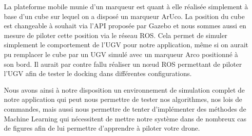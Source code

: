 La plateforme mobile munie d’un marqueur est quant à elle réalisée simplement à base d’un cube sur lequel on a disposé un marqueur ArUco. La position du cube est changeable à souhait via l’API proposée par Gazebo et nous sommes aussi en mesure de piloter cette position via le réseau ROS. Cela permet de simuler simplement le comportement de l’UGV pour notre application, même si on aurait pu remplacer le cube par un UGV simulé avec un marqueur Arco positionné à son bord. Il aurait par contre fallu réaliser un nœud ROS permettant de piloter l’UGV afin de tester le docking dans différentes configurations.

Nous avons ainsi à notre disposition un environnement de simulation complet de notre application qui peut nous permettre de tester nos algorithmes, nos lois de commandes, mais aussi nous permettre de tenter d’implémenter des méthodes de Machine Learning qui nécessitent de mettre notre système dans de nombreux cas de figures afin de lui permettre d’apprendre à piloter votre drone.
